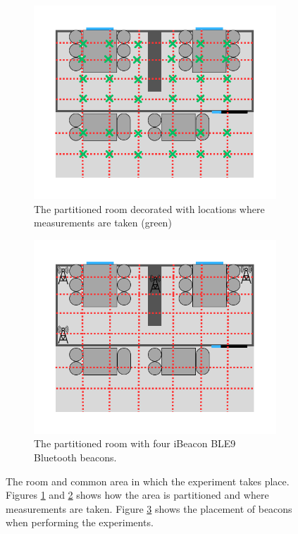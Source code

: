 \begin{figure}
\begin{subfigure}[b]{0.48\textwidth}
        \label{fig:room_partition}
    \end{subfigure}
    \begin{subfigure}[b]{0.48\textwidth}
        \includegraphics[width=\textwidth]{images/roomwithgridandmeasurements.png}
        \caption{The partitioned room decorated with locations where measurements are taken (green)}
        \label{fig:room_partition_measurements}
    \end{subfigure}
    \begin{subfigure}[b]{0.48\textwidth}
        \includegraphics[width=\textwidth]{images/gridwithbeacons.png}
        \caption{The partitioned room with four iBeacon BLE9 Bluetooth beacons. }
        \label{fig:room_partition_beacons}
    \end{subfigure}
    \caption{The room and common area in which the experiment takes place. Figures \ref{fig:room_partition} and \ref{fig:room_partition_measurements} shows how the area is partitioned and where measurements are taken. Figure \ref{fig:room_partition_beacons} shows the placement of beacons when performing the experiments. }
    \label{fig:allfiguresForTheGridPartition}
\end{figure}

